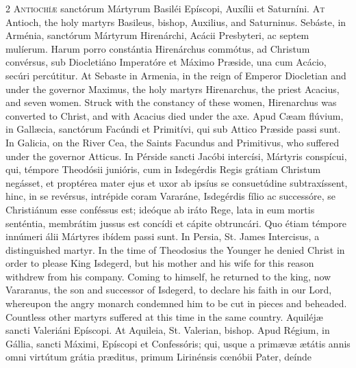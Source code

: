 \begin{paracol}{2}
\lettrine[lines=2]{A}{ntiochíæ} sanctórum 
 Mártyrum Basiléi Epíscopi, Auxílii et Saturníni.
\switchcolumn
{}
\lettrine[lines=2]{A}{t} Antioch, the holy martyrs 
 Basileus, bishop, Auxilius, and Saturninus.
\switchcolumn*
{}
Sebáste, in Arménia, sanctórum Mártyrum Hirenárchi, Acácii Presbyteri, ac septem mulíerum. Harum 
 porro constántia Hirenárchus commótus, ad Christum convérsus, sub 
 Diocletiáno Imperatóre et Máximo Præside, una cum Acácio, secúri percútitur.
\switchcolumn
{}
At Sebaste in Armenia, in the reign 
 of Emperor Diocletian and under the governor Maximus, the holy martyrs 
 Hirenarchus, the priest Acacius, and seven women. Struck with the 
 constancy of these women, Hirenarchus was converted to Christ, and with 
 Acacius died under the axe.
\switchcolumn*
{}
Apud Cæam flúvium, in 
 Gallæcia, sanctórum Facúndi et Primitívi, qui sub Attico Præside passi sunt.
\switchcolumn
{}
In Galicia, on the River Cea, the 
 Saints Facundus and Primitivus, who suffered under the governor Atticus.
\switchcolumn*
{}
In Pérside sancti 
 Jacóbi intercísi, Mártyris conspícui, qui, témpore Theodósii junióris, cum 
 in Isdegérdis Regis grátiam Christum negásset, et proptérea mater ejus et 
 uxor ab ipsíus se consuetúdine subtraxíssent, hinc, in se revérsus, 
 intrépide coram Vararáne, Isdegérdis fílio ac successóre, se Christiánum 
 esse conféssus est; ideóque ab iráto Rege, lata in eum mortis senténtia, 
 membrátim jussus est concídi et cápite obtruncári. Quo étiam témpore 
 innúmeri álii Mártyres ibídem passi sunt.
\switchcolumn
{}
In Persia, St. James Intercisus, a 
 distinguished martyr. In the time of Theodosius the Younger he denied 
 Christ in order to please King Isdegerd, but his mother and his wife for 
 this reason withdrew from his company. Coming to himself, he returned 
 to the king, now Vararanus, the son and successor of Isdegerd, to declare his faith in our Lord, whereupon the angry monarch 
 condemned him to be cut in pieces and beheaded. Countless other 
 martyrs suffered at this time in the same country.
\switchcolumn*
{}
Aquiléjæ sancti 
 Valeriáni Epíscopi.
\switchcolumn
{}
At Aquileia, St. Valerian, bishop.
\switchcolumn*
{}
Apud Régium, in Gállia, 
 sancti Máximi, Epíscopi et Confessóris; qui, usque a primævæ ætátis annis 
 omni virtútum grátia præditus, primum Lirinénsis cœnóbii Pater, deínde 

\end{paracol}
